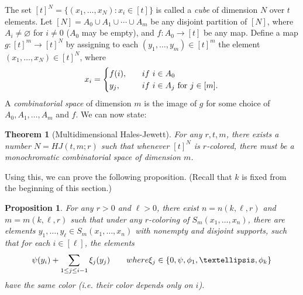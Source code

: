 \documentclass[10pt]{article}
\newtheorem{theorem}{Theorem}[section]
\newtheorem{proposition}[proposition]{Proposition}
\theoremstyle{definition}
\begin{document}
The set $[t]^N = \{(x_1, \ldots, x_N): x_i \in [t] \}$ is called a \textit{cube} of dimension $N$ over $t$ elements. Let $[N] = A_0 \cup A_1 \cup \cdots \cup A_m$ be any disjoint partition of $[N]$, where $A_i \neq \varnothing$ for $i \neq 0$ ($A_0$ may be empty), and $f: A_0 \rightarrow [t]$ be any map. Define a map $g: [t]^m \rightarrow [t]^N$ by assigning to each $(y_1, \ldots, y_m) \in [t]^m$ the element $(x_1, \ldots, x_N) \in [t]^N$, where
\begin{equation}
x_i = 
\begin{cases}
f(i), \quad &\textup{if}\ i \in A_0 \\
y_j, \quad &\textup{if}\ i \in A_j \text{ for }j \in [m].
\end{cases}
\end{equation}
A \textit{combinatorial space} of dimension $m$ is the image of $g$ for some choice of $A_0, A_1, \ldots, A_m$ and $f$. We can now state:

\begin{theorem}[Multidimensional Hales-Jewett] For any $r, t, m$, there exists a number $N=HJ(t, m;r)$ such that whenever $[t]^N$ is $r$-colored, there must be a monochromatic combinatorial space of dimension $m$.
\end{theorem}

Using this, we can prove the following proposition. (Recall that $k$ is fixed from the beginning of this section.)

\begin{proposition} \label{prop:mpc}
 For any $r>0$ and $\ell >0$, there exist $n=n(k,\ell, r)$ and $m=m(k,\ell, r)$ such that under any $r$-coloring of $S_{m}(x_1,\ldots, x_n)$, there are elements 
$y_1, \ldots, y_\ell \in S_m(x_1,\ldots, x_n)$ with nonempty and disjoint supports, such that for each $i \in [\ell]$, the elements
\[
\psi(y_i) + \sum_{1 \leq j \leq i-1} \xi_j (y_j) \qquad \textup{ where } \xi_j \in \{ 0, \psi, \phi_1, \ldots, \phi_k \}
\]
have the same color (i.e. their color depends only on $i$).
\end{proposition}
\end{document}
